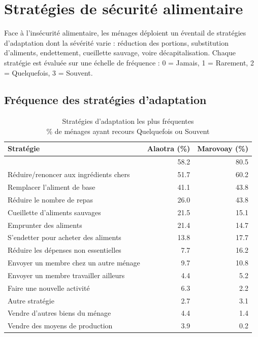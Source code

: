 \documentclass[
  french,
  letterpaper,
]{report}
\begin{document}
\section{Stratégies de sécurité
alimentaire}\label{stratuxe9gies-de-suxe9curituxe9-alimentaire}

Face à l'insécurité alimentaire, les ménages déploient un éventail de
stratégies d'adaptation dont la sévérité varie : réduction des portions,
substitution d'aliments, endettement, cueillette sauvage, voire
décapitalisation. Chaque stratégie est évaluée sur une échelle de
fréquence : 0 = Jamais, 1 = Rarement, 2 = Quelquefois, 3 = Souvent.

\subsection{Fréquence des stratégies
d'adaptation}\label{fruxe9quence-des-stratuxe9gies-dadaptation}

\begin{table}
\caption*{
{\fontsize{20}{25}\selectfont  Stratégies d'adaptation les plus fréquentes\fontsize{12}{15}\selectfont } \\ 
{\fontsize{14}{17}\selectfont  \% de ménages ayant recours \guillemotleft Quelquefois \guillemotright ou \guillemotleft Souvent \guillemotright\fontsize{12}{15}\selectfont }
} 
\fontsize{12.0pt}{14.0pt}\selectfont
\begin{tabular*}{\linewidth}{@{\extracolsep{\fill}}lrr}
\toprule
Stratégie & Alaotra (\%) & Marovoay (\%) \\ 
\midrule\addlinespace[2.5pt]
{{Réduire la ration à chaque repas}} & {{58.2}} & {{80.5}} \\ 
Réduire/renoncer aux ingrédients chers & 51.7 & 60.2 \\ 
{{Remplacer l'aliment de base}} & {{41.1}} & {{43.8}} \\ 
Réduire le nombre de repas & 26.0 & 43.8 \\ 
{{Cueillette d'aliments sauvages}} & {{21.5}} & {{15.1}} \\ 
Emprunter des aliments & 21.4 & 14.7 \\ 
{{S'endetter pour acheter des aliments}} & {{13.8}} & {{17.7}} \\ 
Réduire les dépenses non essentielles & 7.7 & 16.2 \\ 
{{Envoyer un membre chez un autre ménage}} & {{9.7}} & {{10.8}} \\ 
Envoyer un membre travailler ailleurs & 4.4 & 5.2 \\ 
{{Faire une nouvelle activité}} & {{6.3}} & {{2.2}} \\ 
Autre stratégie & 2.7 & 3.1 \\ 
{{Vendre d'autres biens du ménage}} & {{4.4}} & {{1.4}} \\ 
Vendre des moyens de production & 3.9 & 0.2 \\ 
\bottomrule
\end{tabular*}
\end{table}
\end{document}
